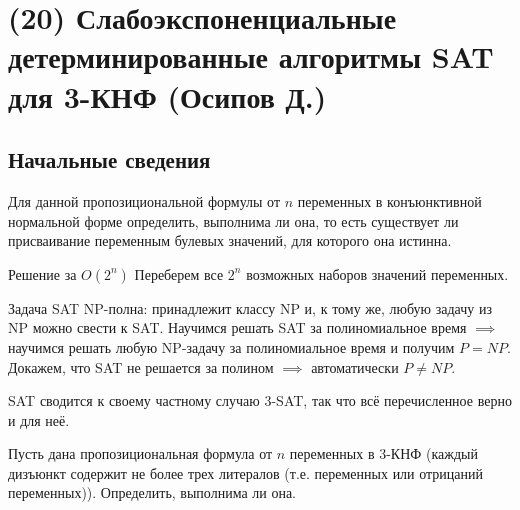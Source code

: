 \hypertarget{3sat}{}
\section{(20) Слабоэкспоненциальные детерминированные алгоритмы SAT для 3-КНФ (Осипов Д.)}
\subsection{Начальные сведения}
\begin{problem*}[SAT]
Для данной пропозициональной формулы от $n$ переменных в конъюнктивной нормальной форме определить, выполнима ли она, то есть существует ли присваивание переменным булевых значений, для которого она истинна.
\end{problem*}

\begin{algodescription}{Решение за $O(2^n)$}
    Переберем все $2^n$ возможных наборов значений переменных.
\end{algodescription}

\begin{nb*}
    Задача SAT NP-полна: принадлежит классу NP и, к тому же, любую задачу из NP можно свести к SAT. Научимся решать SAT за полиномиальное время $\implies$ научимся решать любую NP-задачу за полиномиальное время и получим $P=NP$. Докажем, что SAT не решается за полином $\implies$ автоматически $P\neq NP$.
\end{nb*}

\begin{nb*}
	SAT сводится к своему частному случаю 3-SAT, так что всё перечисленное верно и для неё.
\end{nb*}

\begin{problem*}[3-SAT]
	Пусть дана пропозициональная формула от $n$ переменных в 3-КНФ (каждый дизъюнкт содержит не более трех литералов (т.е. переменных или отрицаний переменных)). Определить, выполнима ли она.
\end{problem*}

